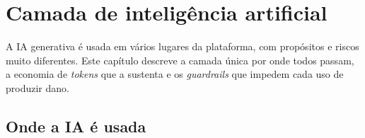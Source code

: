 \chapter{Camada de inteligência artificial}
\label{cap:ia}

A IA generativa é usada em vários lugares da plataforma, com propósitos e riscos
muito diferentes. Este capítulo descreve a camada única por onde todos passam, a
economia de \emph{tokens} que a sustenta e os \emph{guardrails} que impedem cada
uso de produzir dano.

\section{Onde a IA é usada}

